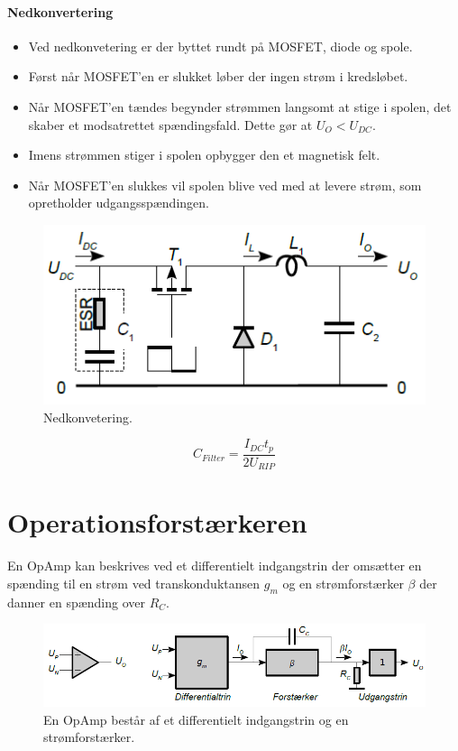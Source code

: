 \documentclass[danish]{article}
\begin{document}
\paragraph{Nedkonvertering}
\begin{itemize}
	\item Ved nedkonvetering er der byttet rundt på MOSFET, diode og
	spole.
	\item Først når MOSFET’en er slukket løber der ingen strøm i kredsløbet.
	\item Når MOSFET’en tændes begynder strømmen langsomt at stige i spolen, det skaber et modsatrettet spændingsfald. Dette gør at $U_O < U_{DC}$.
	\item Imens strømmen stiger i spolen opbygger den et magnetisk felt.
	\item Når MOSFET’en slukkes vil spolen blive ved med at levere strøm, som opretholder udgangsspændingen.
\end{itemize}

\begin{figure} [H]
	\centering
	\includegraphics[width=0.8\linewidth]{graphics/nedkonvertering}
	\caption{Nedkonvetering.}
	\label{fig:nedkonvertering}
\end{figure}

\begin{equation}
C_{Filter} = \dfrac{I_{DC}t_p}{2 U_{RIP}}
\end{equation}


\newpage 
\section{Operationsforstærkeren}
En OpAmp kan beskrives ved et differentielt indgangstrin der omsætter en spænding til en strøm ved transkonduktansen $g_m$ og en strømforstærker $\beta$ der danner en spænding over $R_C$.

\begin{figure} [H]
	\centering
	\includegraphics[width=\linewidth]{graphics/opamp_trin}
	\caption{En OpAmp består af et differentielt indgangstrin og en strømforstærker.}
	\label{fig:opamptrin}
\end{figure}
\end{document}
